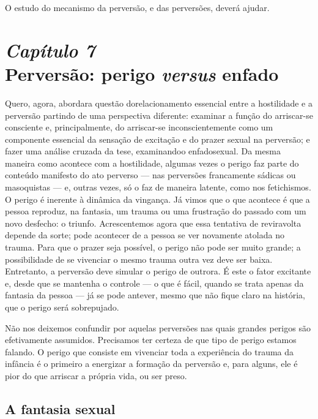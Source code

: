 O estudo do mecanismo da perversão, e das perversões, deverá ajudar.


\chapter[\textbf{7}\quad Perversão: perigo \textit{versus} enfado]{{\large\textit{Capítulo 7}}\\ Perversão: perigo \textit{versus} enfado}

Quero, agora, abordar\idxperigo[|(] a questão do\idxpervexpos[|(] relacionamento essencial entre a
hostilidade e a perversão partindo de uma perspectiva diferente:
examinar a função do arriscar-se consciente e,\idxperigocon{} principalmente, do
arriscar-se inconscientemente como um componente essencial da sensação
de excitação e do prazer sexual na perversão; e fazer uma análise
cruzada da tese, examinando\idxpervenfad[|(] o enfado\idxenfa[|(] sexual. Da mesma maneira como
acontece com a hostilidade, algumas vezes o perigo faz parte do
conteúdo manifesto do ato perverso --- nas perversões francamente
sádicas ou masoquistas --- e, outras vezes, só o faz de maneira
latente, como nos fetichismos.\idxfetic{} O perigo é inerente à dinâmica da
vingança.\idxvinga{} Já vimos que o que acontece é que a pessoa reproduz, na
fantasia, um trauma ou uma frustração do passado com um novo desfecho:
o triunfo. Acrescentemos agora que essa tentativa de reviravolta
depende da sorte; pode acontecer de a pessoa se ver novamente atolada
no trauma. Para que o prazer seja possível, o perigo não pode ser muito
grande; a possibilidade de se vivenciar o mesmo trauma outra vez deve
ser baixa. Entretanto, a perversão deve simular o perigo de outrora. É
este o fator excitante e, desde que se mantenha o controle --- o que é
fácil, quando se trata apenas da fantasia da pessoa --- já se pode
antever, mesmo que não fique claro na história, que o perigo será
sobrepujado.

Não nos deixemos confundir por aquelas perversões nas quais grandes
perigos são efetivamente assumidos. Precisamos ter certeza de que tipo
de perigo estamos falando. O perigo que consiste em vivenciar toda a
experiência do trauma da infância é o primeiro a energizar a formação
da perversão e, para alguns, ele é pior do que arriscar a própria vida,
ou ser preso.


\section{A fantasia sexual}

